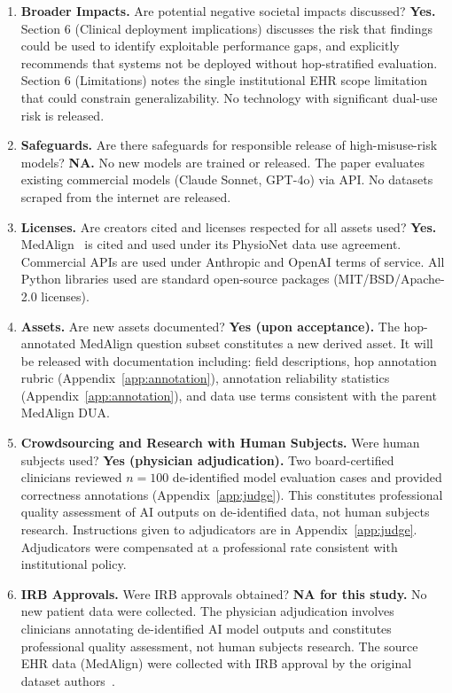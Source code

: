 \documentclass{article}
\begin{document}
\begin{enumerate}
\item \textbf{Broader Impacts.}
Are potential negative societal impacts discussed?
\textbf{Yes.} Section 6 (Clinical deployment implications) discusses the
risk that findings could be used to identify exploitable performance gaps,
and explicitly recommends that systems not be deployed without
hop-stratified evaluation. Section 6 (Limitations) notes the single
institutional EHR scope limitation that could constrain generalizability.
No technology with significant dual-use risk is released.

\item \textbf{Safeguards.}
Are there safeguards for responsible release of high-misuse-risk models?
\textbf{NA.} No new models are trained or released. The paper evaluates
existing commercial models (Claude Sonnet, GPT-4o) via API. No datasets
scraped from the internet are released.

\item \textbf{Licenses.}
Are creators cited and licenses respected for all assets used?
\textbf{Yes.} MedAlign~\citep{wornow2024medalign} is cited and used under
its PhysioNet data use agreement. Commercial APIs are used under Anthropic
and OpenAI terms of service. All Python libraries used are standard
open-source packages (MIT/BSD/Apache-2.0 licenses).

\item \textbf{Assets.}
Are new assets documented?
\textbf{Yes (upon acceptance).} The hop-annotated MedAlign question subset
constitutes a new derived asset. It will be released with documentation
including: field descriptions, hop annotation rubric (Appendix~\ref{app:annotation}),
annotation reliability statistics (Appendix~\ref{app:annotation}), and
data use terms consistent with the parent MedAlign DUA.

\item \textbf{Crowdsourcing and Research with Human Subjects.}
Were human subjects used?
\textbf{Yes (physician adjudication).} Two board-certified clinicians
reviewed $n = 100$ de-identified model evaluation cases and provided
correctness annotations (Appendix~\ref{app:judge}). This constitutes
professional quality assessment of AI outputs on de-identified data, not
human subjects research. Instructions given to adjudicators are in
Appendix~\ref{app:judge}. Adjudicators were compensated at a professional
rate consistent with institutional policy.

\item \textbf{IRB Approvals.}
Were IRB approvals obtained?
\textbf{NA for this study.} No new patient data were collected.
The physician adjudication involves clinicians annotating de-identified AI
model outputs and constitutes professional quality assessment, not human
subjects research. The source EHR data (MedAlign) were collected with IRB
approval by the original dataset authors~\citep{wornow2024medalign}.


\end{enumerate}
\end{document}
